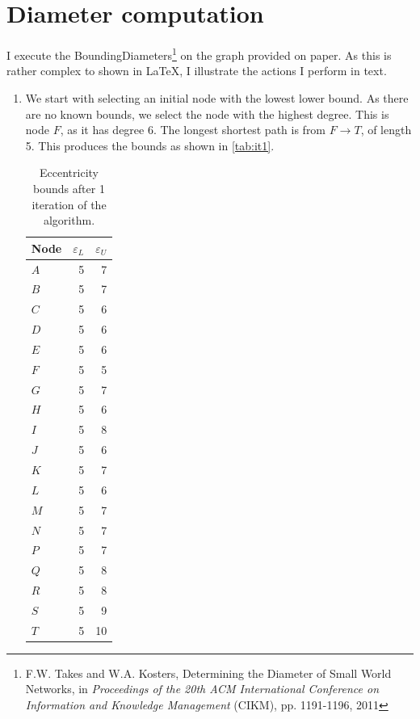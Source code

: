 \documentclass[12pt,a4paper,hidelinks]{article}
\begin{document}
\section{Diameter computation}

I execute the BoundingDiameters\footnote{F.W. Takes and W.A. Kosters, Determining the Diameter of Small World Networks, in \textit{Proceedings of the 20th ACM International Conference on Information
and Knowledge Management} (CIKM), pp. 1191-1196, 2011} on the graph provided on paper. As this is rather complex to shown in \LaTeX, I illustrate the actions I perform in text.

\begin{enumerate}
	\item We start with selecting an initial node with the lowest lower bound. As there are no known bounds, we select the node with the highest degree. This is node $F$, as it has degree 6. The longest shortest path is from $F \rightarrow T$, of length 5. This produces the bounds as shown in \autoref{tab:it1}.
	
		\begin{table}
			\centering
			\begin{tabular}{l | r | r}
				Node & $\varepsilon_L$ & $\varepsilon_U$ \\
				\hline
				$A$ & 5 & 7 \\
				$B$ & 5 & 7 \\
				$C$ & 5 & 6 \\
				$D$ & 5 & 6 \\
				$E$ & 5 & 6 \\
				$F$ & 5 & 5 \\
				$G$ & 5 & 7 \\
				$H$ & 5 & 6 \\
				$I$ & 5 & 8 \\
				$J$ & 5 & 6 \\
				$K$ & 5 & 7 \\
				$L$ & 5 & 6 \\
				$M$ & 5 & 7 \\
				$N$ & 5 & 7 \\
				$P$ & 5 & 7 \\
				$Q$ & 5 & 8 \\
				$R$ & 5 & 8 \\
				$S$ & 5 & 9 \\
				$T$ & 5 & 10 \\
			\end{tabular}
			\caption{Eccentricity bounds after 1 iteration of the algorithm.}
			\label{tab:it1}
		\end{table}
	

\end{enumerate}
\end{document}

